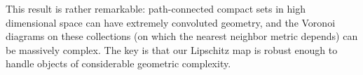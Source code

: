 This result is rather remarkable: path-connected compact sets in high
dimensional space can have extremely convoluted geometry, and the Voronoi diagrams
on these collections (on which the nearest neighbor metric depends) can be
massively complex.  The key is that our Lipschitz map is robust enough to
handle objects of considerable geometric complexity.
  
  

